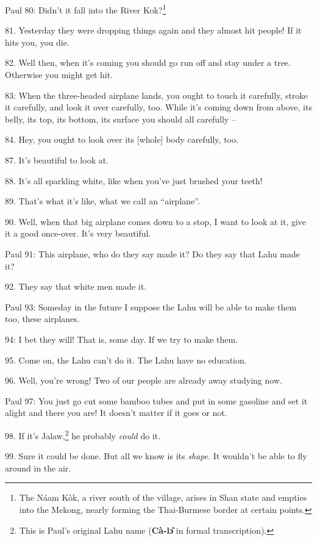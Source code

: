 
Paul 80: Didn't it fall into the River Kok?\footnote{The Náam Kòk, a river south of the village, arises in Shan state and empties into the Mekong, nearly forming the Thai-Burmese border at certain points.}

81. Yesterday they were dropping things again and they almost hit people! 
If it hits you, you die.

82. Well then, when it's coming you should go run off and stay under a tree. Otherwise
you might get hit.

 83: When the three-headed airplane lands, you ought to
touch it carefully, stroke it carefully, and look it over carefully, too. While
it's coming down from above, its belly, its top, its bottom, its surface you should
all carefully --

84. Hey, you ought to look over its [whole] body carefully, too.

87. It's beautiful to look at.

88. It's all sparkling white, like when you've just brushed your teeth!

89. That's what it's like, what we call an ``airplane''.

90. Well, when that big airplane comes down to a stop, I want to look at it, give
it a good once-over. It's very beautiful.

Paul 91: This airplane, who do they say made it? Do they say that Lahu made it?


92. They say that white men made it.

Paul 93: Someday in the future I suppose the Lahu will be able to make them too,
these airplanes.

 94: I bet they will! That is, some day. If we try to
make them.

95. Come on, the Lahu can't do it. The Lahu have no education.

96. Well, you're wrong! Two of our people are already away studying now.

Paul 97: You just go cut some bamboo tubes and put in some gasoline and set it
alight and there you are! It doesn't matter if it goes or not.

98. If it's Jalaw,\footnote{This is Paul's original Lahu name (\textbf{Cà-lɔ̂} in formal transcription).} he probably \textit{could} do it.

99. Sure it could be done. But all we know is its \textit{shape}. It wouldn't be
able to fly around in the air.

